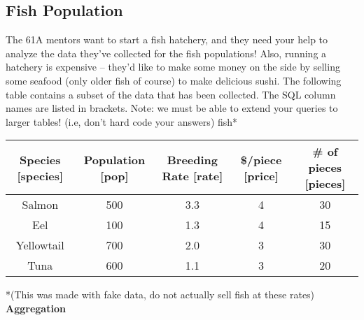 \documentclass{exam}
\begin{document}
\begin{questions}
\begin{blocksection}
\section{Fish Population} 
The 61A mentors want to start a fish hatchery, and they need your help to analyze the data they've collected for the fish populations! Also, running a hatchery is expensive -- they'd like to make some money on the side by selling some seafood (only older fish of course) to make delicious sushi. \newline
\newline
The following table contains a subset of the data that has been collected. The SQL column names are listed in brackets. Note: we must be able to extend your queries to larger tables! (i.e, don't hard code your answers) \newline
\newline
fish*
\begin{center}
\begin{tabular}{ |c|c|c|c|c| } 
 \hline
 Species [species] & Population [pop] & Breeding Rate [rate] & \$/piece [price] & \# of pieces [pieces] \\ 
 \hline
 Salmon & 500 & 3.3 & 4 & 30 \\ 
 \hline
 Eel & 100 & 1.3 & 4 & 15 \\ 
 \hline
  Yellowtail & 700 & 2.0 & 3 & 30 \\ 
 \hline
 Tuna & 600 & 1.1 & 3 & 20 \\ 
 \hline
\end{tabular}
\end{center}
*(This was made with fake data, do not actually sell fish at these rates)
\question \textbf{Aggregation} 
\end{blocksection}
\end{questions}
\end{document}
